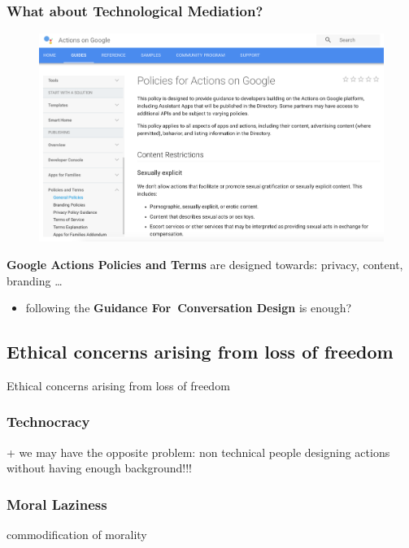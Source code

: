 \documentclass{beamer}
\begin{document}
\begin{frame}
\frametitle{What about Technological Mediation? }
\vspace{-0.6cm}
\begin{figure}
	\centering
	\includegraphics[width=0.85\linewidth]{images/dev_policy}
	\label{fig:devpolicy}
\end{figure}

\textbf{Google Actions Policies and Terms} are designed towards: privacy, content, branding \dots
\begin{itemize}
	\item following the \textbf{Guidance For Conversation Design} is enough?
\end{itemize}
\end{frame}

\subsection{Ethical concerns arising from loss of freedom}
\begin{frame}
\begin{center} 
	 Ethical concerns arising from loss of freedom
\end{center}
\end{frame}

\begin{frame}
	\frametitle{Technocracy}
 + we may have the opposite problem: non technical people designing actions without having enough background!!!	
\end{frame}

\begin{frame}
\frametitle{Moral Laziness}
commodification of morality
\end{frame}
\end{document}
